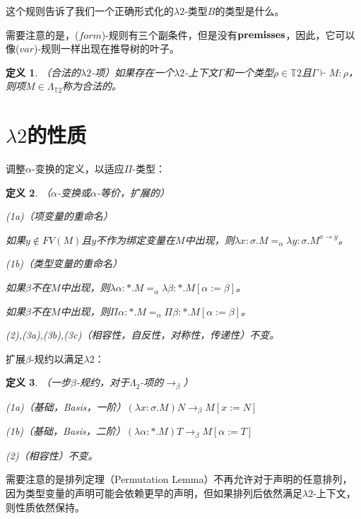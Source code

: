 \documentclass[UTF8]{article}
\newtheorem{thm}{定义}[section]
\begin{document}
		这个规则告诉了我们一个正确形式化的$\lambda{2}$-类型$B$的类型是什么。
		
		需要注意的是，($form$)-规则有三个副条件，但是没有$\bf premisses$，因此，它可以像($var$)-规则一样出现在推导树的叶子。
		
		\begin{thm}（合法的$\lambda{2}$-项）如果存在一个$\lambda{2}$-上下文$\Gamma$和一个类型$\rho\in\mathbb{T}2$且$\Gamma\vdash M:\rho$，则项$M\in\Lambda_{\mathbb{T}2}$称为合法的。
		\end{thm}
	
	\section{$\lambda{2}$的性质}
		调整$\alpha$-变换的定义，以适应$\Pi$-类型：
		
		\begin{thm}（$\alpha$-变换或$\alpha$-等价，扩展的）
			
			(1a)（项变量的重命名）
			
			如果$y\notin FV(M)$且$y$不作为绑定变量在$M$中出现，则$\lambda x:\sigma.M=_\alpha\lambda y:\sigma.M^{x\rightarrow y}$。
			
			(1b)（类型变量的重命名）
			
			如果$\beta$不在$M$中出现，则$\lambda\alpha:*.M=_\alpha\lambda\beta:*.M\left[\alpha:=\beta\right]$。
			
			如果$\beta$不在$M$中出现，则$\Pi\alpha:*.M=_\alpha\Pi\beta:*.M\left[\alpha:=\beta\right]$。
			
			(2),(3a),(3b),(3c)（相容性，自反性，对称性，传递性）不变。
			
		\end{thm}
	
		扩展$\beta$-规约以满足$\lambda{2}$：
		
		\begin{thm}（一步$\beta$-规约，对于$\Lambda_2$-项的$\rightarrow_\beta$）
			
			(1a)（基础，Basis，一阶）$(\lambda x:\sigma.M)N \rightarrow_\beta M\left[x:=N\right]$
			
			(1b)（基础，Basis，二阶）$(\lambda\alpha:*.M)T\rightarrow_\beta M\left[\alpha:= T\right]$
			
			(2)（相容性）不变。
		\end{thm}
		
		需要注意的是排列定理（Permutation Lemma）不再允许对于声明的任意排列，因为类型变量的声明可能会依赖更早的声明，但如果排列后依然满足$\lambda{2}$-上下文，则性质依然保持。
		
\end{document}
